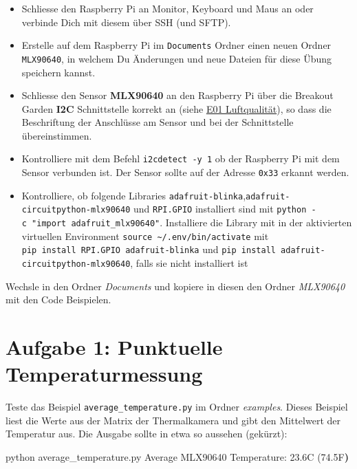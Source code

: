 \documentclass[
  11pt,
  a4paperpaper,
  oneside, openany  ,captions=tableheading
]{scrbook}
\newenvironment{Shaded}{\begin{snugshade}}{\end{snugshade}}
\newcommand{\ErrorTok}[1]{\textcolor[rgb]{0.68,0.00,0.00}{#1}}
\newcommand{\ExtensionTok}[1]{\textcolor[rgb]{0.00,0.23,0.31}{#1}}
\newcommand{\KeywordTok}[1]{\textcolor[rgb]{0.00,0.23,0.31}{\textbf{#1}}}
\newcommand{\NormalTok}[1]{\textcolor[rgb]{0.00,0.23,0.31}{#1}}
\providecommand{\tightlist}{%
  \setlength{\itemsep}{0pt}\setlength{\parskip}{0pt}}
\theoremstyle{definition}
\theoremstyle{remark}
\begin{document}
\begin{itemize}
\tightlist
\item
  Schliesse den Raspberry Pi an Monitor, Keyboard und Maus an oder
  verbinde Dich mit diesem über SSH (und SFTP).
\item
  Erstelle auf dem Raspberry Pi im \texttt{Documents} Ordner einen neuen
  Ordner \texttt{MLX90640}, in welchem Du Änderungen und neue Dateien
  für diese Übung speichern kannst.
\item
  Schliesse den Sensor \textbf{MLX90640} an den Raspberry Pi über die
  Breakout Garden \textbf{I2C} Schnittstelle korrekt an (siehe
  \href{E01_Luftqualitaet.qmd}{E01 Luftqualität}), so dass die
  Beschriftung der Anschlüsse am Sensor und bei der Schnittstelle
  übereinstimmen.
\item
  Kontrolliere mit dem Befehl \texttt{i2cdetect\ -y\ 1} ob der Raspberry
  Pi mit dem Sensor verbunden ist. Der Sensor sollte auf der Adresse
  \texttt{0x33} erkannt werden.
\item
  Kontrolliere, ob folgende Libraries
  \texttt{adafruit-blinka},\texttt{adafruit-circuitpython-mlx90640} und
  \texttt{RPI.GPIO} installiert sind mit
  \texttt{python\ -c\ "import\ adafruit\_mlx90640"}. Installiere die
  Library mit in der aktivierten virtuellen Environment
  \texttt{source\ \textasciitilde{}/.env/bin/activate} mit
  \texttt{pip\ install\ RPI.GPIO\ adafruit-blinka} und
  \texttt{pip\ install\ adafruit-circuitpython-mlx90640}, falls sie
  nicht installiert ist
\end{itemize}

Wechsle in den Ordner \emph{Documents} und kopiere in diesen den Ordner
\emph{MLX90640} mit den Code Beispielen.

\section{Aufgabe 1: Punktuelle
Temperaturmessung}\label{aufgabe-1-punktuelle-temperaturmessung}

Teste das Beispiel \texttt{average\_temperature.py} im Ordner
\emph{examples}. Dieses Beispiel liest die Werte aus der Matrix der
Thermalkamera und gibt den Mittelwert der Temperatur aus. Die Ausgabe
sollte in etwa so aussehen (gekürzt):

\begin{Shaded}
\begin{Highlighting}[]
\ExtensionTok{python}\NormalTok{ average\_temperature.py }
\ExtensionTok{Average}\NormalTok{ MLX90640 Temperature: 23.6C }\ErrorTok{(}\ExtensionTok{74.5F}\KeywordTok{)}
\end{Highlighting}
\end{Shaded}
\end{document}
